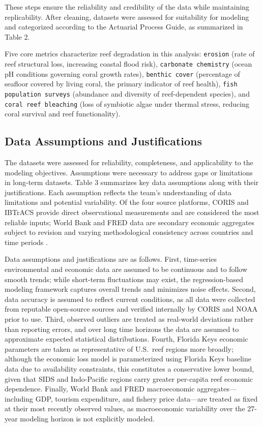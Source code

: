 \documentclass[10pt,letterpaper]{article}
\newcounter{assumption}
\newcounter{metric}
\begin{document}
These steps ensure the reliability and credibility of the data while maintaining replicability. After cleaning, datasets were assessed for suitability for modeling and categorized according to the Actuarial Process Guide, as summarized in Table 2.

Five core metrics characterize reef degradation in this analysis: \texttt{erosion} (rate of reef structural loss, increasing coastal flood risk), \texttt{carbonate chemistry} (ocean pH conditions governing coral growth rates), \texttt{benthic cover} (percentage of seafloor covered by living coral, the primary indicator of reef health), \texttt{fish population surveys} (abundance and diversity of reef-dependent species), and \texttt{coral reef bleaching} (loss of symbiotic algae under thermal stress, reducing coral survival and reef functionality).

\subsection{Data Assumptions and Justifications}

The datasets were assessed for reliability, completeness, and applicability to the modeling objectives. Assumptions were necessary to address gaps or limitations in long-term datasets. Table 3 summarizes key data assumptions along with their justifications. Each assumption reflects the team's understanding of data limitations and potential variability. Of the four source platforms, CORIS and IBTrACS provide direct observational measurements and are considered the most reliable inputs; World Bank and FRED data are secondary economic aggregates subject to revision and varying methodological consistency across countries and time periods \cite{noaa_coris, ibtracs, world_bank, fred}.

Data assumptions and justifications are as follows. First, time-series environmental and economic data
are assumed to be continuous and to follow smooth trends; while short-term fluctuations may exist,
the regression-based modeling framework captures overall trends and minimizes noise effects. Second,
data accuracy is assumed to reflect current conditions, as all data were collected from reputable
open-source sources and verified internally by CORIS and NOAA prior to use. Third, observed outliers
are treated as real-world deviations rather than reporting errors, and over long time horizons the
data are assumed to approximate expected statistical distributions. Fourth, Florida Keys economic
parameters are taken as representative of U.S.\ reef regions more broadly; although the economic
loss model is parameterized using Florida Keys baseline data due to availability constraints, this
constitutes a conservative lower bound, given that SIDS and Indo-Pacific regions carry greater
per-capita reef economic dependence. Finally, World Bank and FRED macroeconomic aggregates---including
GDP, tourism expenditure, and fishery price data---are treated as fixed at their most recently
observed values, as macroeconomic variability over the 27-year modeling horizon is not explicitly
modeled.
\end{document}
